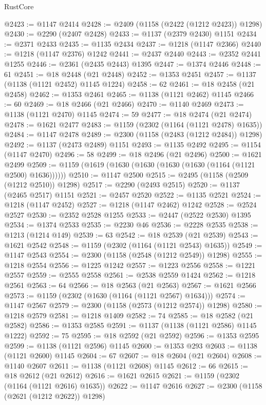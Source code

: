 \begin{lexlean}{RustCore}
\begin{coremodule}
@2423 := @1147 @2414
@2428 := @2409 (@1158 (@2422 (@1212 @2423)) @1298)
@2430 := @2290 (@2407 @2428)
@2433 := @1137 (@2379 @2430) @1151
@2434 := @2371 @2433
@2435 := @1135 @2434
@2437 := @1218 (@1147 @2366)
@2440 := @1218 (@1147 @2376) @1242
@2441 := @2437 @2440
@2443 := @2352 @2441 @1255
@2446 := @2361 (@2435 @2443) @1395
@2447 := @1374 @2446
@2448 := 61
@2451 := @18 @2448 (@21 @2448)
@2452 := @1353 @2451
@2457 := @1137 (@1138 (@1121 @2452) @1145 @1224)
@2458 := 62
@2461 := @18 @2458 (@21 @2458)
@2462 := @1353 @2461
@2465 := @1138 (@1121 @2462) @1145
@2466 := 60
@2469 := @18 @2466 (@21 @2466)
@2470 := @1140 @2469
@2473 := @1138 (@1121 @2470) @1145
@2474 := 59
@2477 := @18 @2474 (@21 @2474)
@2478 := @1621 @2477
@2483 := @1159 (@2302 (@1164 (@1121 @2478) @1635))
@2484 := @1147 @2478
@2489 := @2300 (@1158 (@2483 (@1212 @2484)) @1298)
@2492 := @1137 (@2473 @2489) @1151
@2493 := @1135 @2492
@2495 := @1154 (@1147 @2470)
@2496 := 58
@2499 := @18 @2496 (@21 @2496)
@2500 := @1621 @2499
@2509 := @1159 (@1619 (@1630 (@1630 (@1630 (@1630 (@1164 (@1121 @2500) @1636))))))
@2510 := @1147 @2500
@2515 := @2495 (@1158 (@2509 (@1212 @2510)) @1298)
@2517 := @2290 (@2493 @2515)
@2520 := @1137 (@2465 @2517) @1151
@2521 := @2457 @2520
@2522 := @1135 @2521
@2524 := @1218 (@1147 @2452)
@2527 := @1218 (@1147 @2462) @1242
@2528 := @2524 @2527
@2530 := @2352 @2528 @1255
@2533 := @2447 (@2522 @2530) @1395
@2534 := @1374 @2533
@2535 := @2230 @46
@2536 := @2228 @2535
@2538 := @1213 (@1214 @149)
@2539 := 63
@2542 := @18 @2539 (@21 @2539)
@2543 := @1621 @2542
@2548 := @1159 (@2302 (@1164 (@1121 @2543) @1635))
@2549 := @1147 @2543
@2554 := @2300 (@1158 (@2548 (@1212 @2549)) @1298)
@2555 := @1218 @2554
@2556 := @1225 @1242
@2557 := @1223 @2556
@2558 := @1221 @2557
@2559 := @2555 @2558
@2561 := @2538 @2559 @1424
@2562 := @1218 @2561
@2563 := 64
@2566 := @18 @2563 (@21 @2563)
@2567 := @1621 @2566
@2573 := @1159 (@2302 (@1630 (@1164 (@1121 @2567) @1634)))
@2574 := @1147 @2567
@2579 := @2300 (@1158 (@2573 (@1212 @2574)) @1298)
@2580 := @1218 @2579
@2581 := @1218 @1409
@2582 := 74
@2585 := @18 @2582 (@21 @2582)
@2586 := @1353 @2585
@2591 := @1137 (@1138 (@1121 @2586) @1145 @1222)
@2592 := 75
@2595 := @18 @2592 (@21 @2592)
@2596 := @1353 @2595
@2599 := @1138 (@1121 @2596) @1145
@2600 := @1353 @293
@2603 := @1138 (@1121 @2600) @1145
@2604 := 67
@2607 := @18 @2604 (@21 @2604)
@2608 := @1140 @2607
@2611 := @1138 (@1121 @2608) @1145
@2612 := 66
@2615 := @18 @2612 (@21 @2612)
@2616 := @1621 @2615
@2621 := @1159 (@2302 (@1164 (@1121 @2616) @1635))
@2622 := @1147 @2616
@2627 := @2300 (@1158 (@2621 (@1212 @2622)) @1298)

\end{coremodule}
\end{lexlean}
